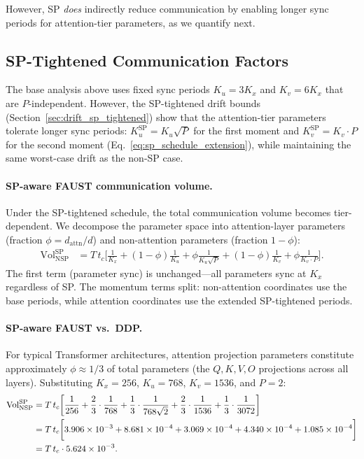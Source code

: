 \documentclass{article}
\begin{document}
However, SP \emph{does} indirectly reduce communication by enabling longer
sync periods for attention-tier parameters, as we quantify next.

\subsection{SP-Tightened Communication Factors}
\label{sec:wallclock_sp_tightened}

The base analysis above uses fixed sync periods $K_u = 3K_x$ and
$K_v = 6K_x$ that are $P$-independent. However, the SP-tightened drift
bounds (Section~\ref{sec:drift_sp_tightened}) show that the attention-tier
parameters tolerate longer sync periods: $K_u^{\text{SP}} = K_u\sqrt{P}$
for the first moment and $K_v^{\text{SP}} = K_v \cdot P$ for the second
moment (Eq.~\eqref{eq:sp_schedule_extension}), while maintaining the
same worst-case drift as the non-SP case.

\paragraph{SP-aware FAUST communication volume.}
Under the SP-tightened schedule, the total communication volume
becomes tier-dependent. We decompose the parameter space into
attention-layer parameters (fraction $\phi = d_{\text{attn}}/d$) and
non-attention parameters (fraction $1 - \phi$):
\begin{align}
\text{Vol}_{\text{NSP}}^{\text{SP}}
&= T\,t_c \biggl[
  \frac{1}{K_x}
  + (1-\phi)\frac{1}{K_u}
  + \phi\frac{1}{K_u\sqrt{P}}
  + (1-\phi)\frac{1}{K_v}
  + \phi\frac{1}{K_v \cdot P}
\biggr].
\label{eq:vol_nsp_sp}
\end{align}
The first term (parameter sync) is unchanged---all parameters sync at
$K_x$ regardless of SP. The momentum terms split: non-attention
coordinates use the base periods, while attention coordinates use the
extended SP-tightened periods.

\paragraph{SP-aware FAUST vs.\ DDP.}
For typical Transformer architectures, attention projection parameters
constitute approximately $\phi \approx 1/3$ of total parameters (the
$Q, K, V, O$ projections across all layers). Substituting $K_x = 256$,
$K_u = 768$, $K_v = 1536$, and $P = 2$:
\begin{align}
\text{Vol}_{\text{NSP}}^{\text{SP}}
&= T\,t_c \biggl[
  \frac{1}{256}
  + \frac{2}{3} \cdot \frac{1}{768}
  + \frac{1}{3} \cdot \frac{1}{768\sqrt{2}}
  + \frac{2}{3} \cdot \frac{1}{1536}
  + \frac{1}{3} \cdot \frac{1}{3072}
\biggr]
\notag \\
&= T\,t_c \biggl[
  3.906 \times 10^{-3}
  + 8.681 \times 10^{-4}
  + 3.069 \times 10^{-4}
  + 4.340 \times 10^{-4}
  + 1.085 \times 10^{-4}
\biggr]
\notag \\
&= T\,t_c \cdot 5.624 \times 10^{-3}.
\label{eq:vol_nsp_sp_concrete}
\end{align}
\end{document}
